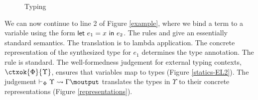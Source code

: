\begin{figure*}[t]
\begin{mathpar}

\end{mathpar}
\caption{Typing}
\label{statics-EL}
\end{figure*}

We can now continue to line 2 of Figure \ref{example}, where we bind a term to a variable using the form $\elet{e_1}{x}{e_2}$. The rules  and  give an essentially standard semantics. The translation is to lambda application. The concrete representation of the synthesized type for $e_1$ determines the type annotation. The  rule is standard. The well-formedness judgement for external typing contexts, $\ctxok{\Phi}{\Upsilon}$, ensures that variables map to types (Figure \ref{statics-EL2}). The judgement $\vdash_\Phi \Upsilon \leadsto \Gamma\moutput$ translates the types in $\Upsilon$ to their concrete representations (Figure \ref{representations}).

